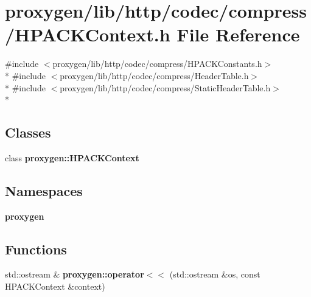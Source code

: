 \section{proxygen/lib/http/codec/compress/\+H\+P\+A\+C\+K\+Context.h File Reference}
\label{HPACKContext_8h}
{\ttfamily \#include $<$proxygen/lib/http/codec/compress/\+H\+P\+A\+C\+K\+Constants.\+h$>$}\\*
{\ttfamily \#include $<$proxygen/lib/http/codec/compress/\+Header\+Table.\+h$>$}\\*
{\ttfamily \#include $<$proxygen/lib/http/codec/compress/\+Static\+Header\+Table.\+h$>$}\\*
\subsection*{Classes}
\begin{DoxyCompactItemize}
\item 
class {\bf proxygen\+::\+H\+P\+A\+C\+K\+Context}
\end{DoxyCompactItemize}
\subsection*{Namespaces}
\begin{DoxyCompactItemize}
\item 
 {\bf proxygen}
\end{DoxyCompactItemize}
\subsection*{Functions}
\begin{DoxyCompactItemize}
\item 
std\+::ostream \& {\bf proxygen\+::operator$<$$<$} (std\+::ostream \&os, const H\+P\+A\+C\+K\+Context \&context)
\end{DoxyCompactItemize}
